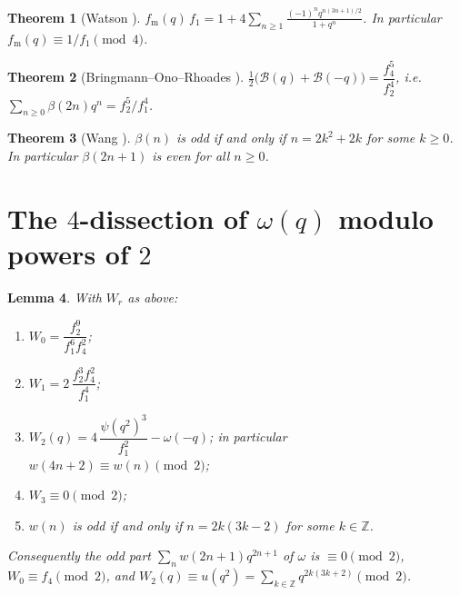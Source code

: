 \documentclass[11pt]{amsart}
\newtheorem{theorem}{Theorem}[section]
\newtheorem{lemma}[theorem]{Lemma}
\theoremstyle{definition}
\theoremstyle{remark}
\numberwithin{equation}{section}
\newcommand{\Z}{\mathbb{Z}}
\begin{document}
\begin{theorem}[Watson \cite{Wat}]\label{thm:watsonf}
$f_{\mathrm m}(q)\,f_1=1+4\sum_{n\ge1}\frac{(-1)^nq^{n(3n+1)/2}}{1+q^n}$. In particular $f_{\mathrm m}(q)\equiv 1/f_1\pmod 4$.
\end{theorem}

\begin{theorem}[Bringmann--Ono--Rhoades \cite{BOR}]\label{thm:BOR}
$\frac12\big(\mathcal B(q)+\mathcal B(-q)\big)=\dfrac{f_4^5}{f_2^4}$, i.e.\ $\sum_{n\ge0}\beta(2n)q^n=f_2^5/f_1^4$.
\end{theorem}

\begin{theorem}[Wang {\cite[Thm.~3.2]{Wang}}]\label{thm:wang}
$\beta(n)$ is odd if and only if $n=2k^2+2k$ for some $k\ge0$. In particular $\beta(2n+1)$ is even for all $n\ge0$.
\end{theorem}

\section{The \texorpdfstring{$4$}{4}-dissection of \texorpdfstring{$\omega(q)$}{omega(q)} modulo powers of \texorpdfstring{$2$}{2}}\label{sec:omega}

\begin{lemma}\label{lem:omega}
With $W_r$ as above:
\begin{enumerate}[label=\textup{(\roman*)}]
\item $W_0=\dfrac{f_2^9}{f_1^6f_4^2}$;
\item $W_1=2\,\dfrac{f_2^3f_4^2}{f_1^4}$;
\item $W_2(q)=4\,\dfrac{\psi(q^2)^3}{f_1^2}-\omega(-q)$; in particular $w(4n+2)\equiv w(n)\pmod 2$;
\item $W_3\equiv0\pmod 2$;
\item $w(n)$ is odd if and only if $n=2k(3k-2)$ for some $k\in\Z$.
\end{enumerate}
Consequently the odd part $\sum_n w(2n+1)q^{2n+1}$ of $\omega$ is $\equiv0\pmod2$, $W_0\equiv f_4\pmod 2$, and $W_2(q)\equiv u(q^2)=\sum_{k\in\Z}q^{2k(3k+2)}\pmod 2$.
\end{lemma}
\end{document}
